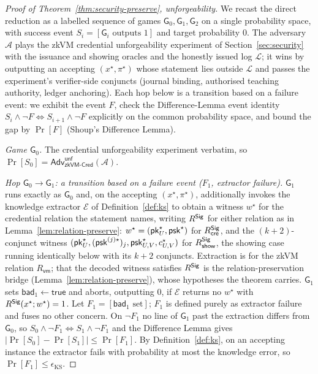 \begin{proof}[Proof of Theorem~\ref{thm:security-preserve}, unforgeability]
We recast the direct reduction as a labelled sequence of games $\mathsf G_0,\mathsf G_1,\mathsf G_2$ on a single probability space, with success event $S_i=[\mathsf G_i\text{ outputs }1]$ and target probability $0$. The adversary $\mathcal A$ plays the zkVM credential unforgeability experiment of Section~\ref{sec:security} with the issuance and showing oracles and the honestly issued log $\mathcal L$; it wins by outputting an accepting $(x^\star,\pi^\star)$ whose statement lies outside $\mathcal L$ and passes the experiment's verifier-side conjuncts (journal binding, authorised teaching authority, ledger anchoring). Each hop below is a transition based on a failure event: we exhibit the event $F$, check the Difference-Lemma event identity $S_i\wedge\neg F\iff S_{i+1}\wedge\neg F$ explicitly on the common probability space, and bound the gap by $\Pr[F]$ (Shoup's Difference Lemma).

    \smallskip\noindent\emph{Game $\mathsf G_0$.} The credential
unforgeability experiment verbatim, so $\Pr[S_0]=\mathsf{Adv}^{\mathsf{unf}}_{\mathsf{zkVM\text{-}Cred}}(\mathcal A)$.

    \smallskip\noindent\emph{Hop $\mathsf G_0\to\mathsf G_1$: a transition based on
a failure event ($F_1$, extractor failure).} $\mathsf G_1$ runs exactly as $\mathsf G_0$ and, on the accepting $(x^\star,\pi^\star)$, additionally invokes the knowledge extractor $\mathcal E$ of Definition~\ref{def:ks} to obtain a witness $w^\star$ for the credential relation the statement names, writing $R^{\mathsf{Sig}}$ for either relation as in Lemma~\ref{lem:relation-preserve}: $w^\star=(\mathsf{pk}_U^\star,\mathsf{psk}^\star)$ for $R^{\mathsf{Sig}}_{\mathsf{cre}}$, and the $(k+2)$-conjunct witness $(\mathsf{pk}_U^\star,(\mathsf{psk}^{(j)\star})_j,\mathsf{psk}_{U,V}^\star,c_{U,V}^\star)$ for $R^{\mathsf{Sig}}_{\mathsf{show}}$, the showing case running identically below with its $k+2$ conjuncts. Extraction is for the zkVM relation $R_{\mathsf{vm}}$; that the decoded witness satisfies $R^{\mathsf{Sig}}$ is the relation-preservation bridge (Lemma~\ref{lem:relation-preserve}), whose hypotheses the theorem carries. $\mathsf G_1$ sets $\mathsf{bad}_1\leftarrow\mathsf{true}$ and aborts, outputting $0$, if $\mathcal E$ returns no $w^\star$ with $R^{\mathsf{Sig}}(x^\star;w^\star)=1$. Let $F_1=[\mathsf{bad}_1\text{ set}]$; $F_1$ is defined purely as extractor failure and fuses no other concern. On $\neg F_1$ no line of $\mathsf G_1$ past the extraction differs from $\mathsf G_0$, so $S_0\wedge\neg F_1\iff S_1\wedge\neg F_1$ and the Difference Lemma gives $|\Pr[S_0]-\Pr[S_1]|\le\Pr[F_1]$. By Definition~\ref{def:ks}, on an accepting instance the extractor fails with probability at most the knowledge error, so $\Pr[F_1]\le\epsilon_{\mathrm{KS}}$.


\end{proof}

